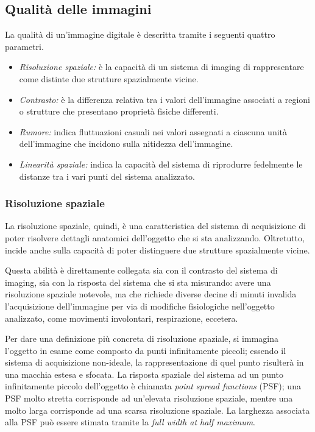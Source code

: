 \documentclass[11pt, a4paper]{scrartcl}
\theoremstyle{style}
\theoremstyle{style1}
\numberwithin{equation}{subsection}
\begin{document}
\subsection{Qualit\`a delle immagini}
La qualit\`a di un'immagine digitale \`e descritta tramite i seguenti quattro parametri.
\begin{itemize}
	\item \textit{Risoluzione spaziale:} è la capacità di un sistema di imaging di rappresentare come distinte due strutture spazialmente vicine.
	\item \textit{Contrasto:} è la differenza relativa tra i valori dell'immagine associati a regioni o strutture che presentano proprietà fisiche differenti.
	\item \textit{Rumore:} indica fluttuazioni casuali nei valori assegnati a ciascuna unit\`a dell'immagine che incidono sulla nitidezza dell'immagine.
	\item \textit{Linearit\`a spaziale:} indica la capacit\`a del sistema di riprodurre fedelmente le distanze tra i vari punti del sistema analizzato.
\end{itemize}

\subsubsection{Risoluzione spaziale}

La risoluzione spaziale, quindi, \`e una caratteristica del sistema di acquisizione di poter risolvere dettagli anatomici dell'oggetto che si sta analizzando. 
Oltretutto, incide anche sulla capacit\`a di poter distinguere due strutture spazialmente vicine.

Questa abilit\`a \`e direttamente collegata sia con il contrasto del sistema di imaging, sia con la risposta del sistema che si sta misurando: avere una risoluzione spaziale notevole, ma che richiede diverse decine di minuti invalida l'acquisizione dell'immagine per via di modifiche fisiologiche nell'oggetto analizzato, come movimenti involontari, respirazione, eccetera.

Per dare una definizione pi\`u concreta di risoluzione spaziale, si immagina l'oggetto in esame come composto da punti infinitamente piccoli; essendo il sistema di acquisizione non-ideale, la rappresentazione di quel punto risulter\`a in una macchia estesa e sfocata.
La risposta spaziale del sistema ad un punto infinitamente piccolo dell'oggetto \`e chiamata \textit{point spread functions} (PSF); una PSF molto stretta corrisponde ad un'elevata risoluzione spaziale, mentre una molto larga corrisponde ad una scarsa risoluzione spaziale.
La larghezza associata alla PSF pu\`o essere stimata tramite la \textit{full width at half maximum}.
\end{document}
